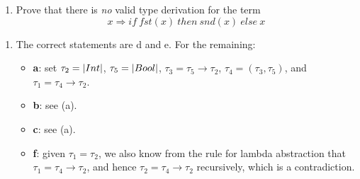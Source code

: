 \begin{exercise}{}
\begin{enumerate}
    \item Prove that there is \emph{no} valid type derivation for the term
    \begin{equation*}
      x \Rightarrow if~ fst(x) ~then~ snd(x)~ else~ x
    \end{equation*}
  \end{enumerate}

  \begin{solution}

    \begin{enumerate}
      \item The correct statements are d and e. For the remaining:
      \begin{itemize}
        \item \textbf{a}: set \(\tau_2 = \lstinline|Int|\), \(\tau_5 =
        \lstinline|Bool|\), \(\tau_3 = \tau_5 \to \tau_2\), \(\tau_4 = (\tau_3,
        \tau_5)\), and \(\tau_1 = \tau_4 \to \tau_2\).
        \item \textbf{b}: see (a).
        \item \textbf{c}: see (a).
        \item \textbf{f}: given \(\tau_1 = \tau_2\), we also know from the rule
        for lambda abstraction that \(\tau_1 = \tau_4 \to \tau_2\), and hence
        \(\tau_2 = \tau_4 \to \tau_2\) recursively, which is a contradiction.
      \end{itemize}


\end{enumerate}
\end{solution}
\end{exercise}
